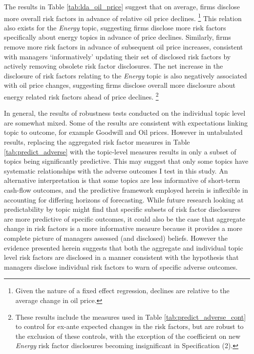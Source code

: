 The results in Table \ref{tab:lda_oil_price} suggest that on average, firms disclose more overall risk factors in advance of relative oil price declines.%
	\footnote{Given the nature of a fixed effect regression, declines are relative to the average change in oil price.}
This relation also exists for the \textit{Energy} topic, suggesting firms disclose more risk factors specifically about energy topics in advance of price declines.
Similarly, firms remove more risk factors in advance of subsequent oil price increases, consistent with managers `informatively' updating their set of disclosed risk factors by actively removing obsolete risk factor disclosures.
The net increase in the disclosure of risk factors relating to the \textit{Energy} topic is also negatively associated with oil price changes, suggesting firms disclose overall more disclosure about energy related risk factors ahead of price declines.%
    \footnote{These results include the measures used in Table \ref{tab:predict_adverse_cont} to control for ex-ante expected changes in the risk factors, but are robust to the exclusion of these controls, with the exception of the coefficient on new \textit{Energy} risk factor disclosures becoming insignificant in Specification (2).}



In general, the results of robustness tests conducted on the individual topic level are somewhat mixed.
Some of the results are consistent with expectations linking topic to outcome, for example Goodwill and Oil prices.
However in untabulated results, replacing the aggregated risk factor measures in Table  \ref{tab:predict_adverse} with the topic-level measures results in only a subset of topics being significantly predictive.
This may suggest that only some topics have systematic relationships with the adverse outcomes I test in this study.
An alternative interpretation is that some topics are less informative of short-term cash-flow outcomes, and the predictive framework employed herein is inflexible in accounting for differing horizons of forecasting.
While future research looking at predictability by topic might find that specific subsets of risk factor disclosures are more predictive of specific outcomes, it could also be the case that aggregate change in risk factors is a more informative measure because it provides a more complete picture of managers assessed (and disclosed) beliefs.
However the evidence presented herein suggests that both the aggregate and individual topic level risk factors are disclosed in a manner consistent with the hypothesis that managers disclose individual risk factors to warn of specific adverse outcomes.





